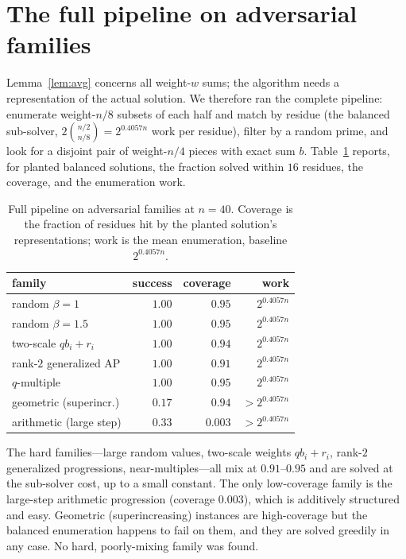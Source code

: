 \documentclass[conference]{IEEEtran}
\begin{document}
\section{The full pipeline on adversarial families}\label{sec:exp}
Lemma~\ref{lem:avg} concerns all weight-$w$ sums; the algorithm needs a
representation of the actual solution. We therefore ran the complete pipeline:
enumerate weight-$n/8$ subsets of each half and match by residue (the balanced
sub-solver, $2\binom{n/2}{n/8}=2^{0.4057n}$ work per residue), filter by a random
prime, and look for a disjoint pair of weight-$n/4$ pieces with exact sum $b$.
Table~\ref{tab:adv} reports, for planted balanced solutions, the fraction solved
within $16$ residues, the coverage, and the enumeration work.

\begin{table}[t]
\centering
\caption{Full pipeline on adversarial families at $n=40$. Coverage is the
fraction of residues hit by the planted solution's representations; work is the
mean enumeration, baseline $2^{0.4057n}$.}
\label{tab:adv}
\begin{tabular}{lrrr}
\toprule
family & success & coverage & work\\
\midrule
random $\beta=1$        & $1.00$ & $0.95$ & $2^{0.4057n}$\\
random $\beta=1.5$      & $1.00$ & $0.95$ & $2^{0.4057n}$\\
two-scale $q b_i+r_i$   & $1.00$ & $0.94$ & $2^{0.4057n}$\\
rank-$2$ generalized AP & $1.00$ & $0.91$ & $2^{0.4057n}$\\
$q$-multiple            & $1.00$ & $0.95$ & $2^{0.4057n}$\\
geometric (superincr.)  & $0.17$ & $0.94$ & $>2^{0.4057n}$\\
arithmetic (large step) & $0.33$ & $0.003$ & $>2^{0.4057n}$\\
\bottomrule
\end{tabular}
\end{table}

The hard families---large random values, two-scale weights $qb_i+r_i$, rank-$2$
generalized progressions, near-multiples---all mix at $0.91$--$0.95$ and are
solved at the sub-solver cost, up to a small constant. The only low-coverage
family is the large-step arithmetic progression (coverage $0.003$), which is
additively structured and easy. Geometric (superincreasing) instances are
high-coverage but the balanced enumeration happens to fail on them, and they are
solved greedily in any case. No hard, poorly-mixing family was found.
\end{document}
